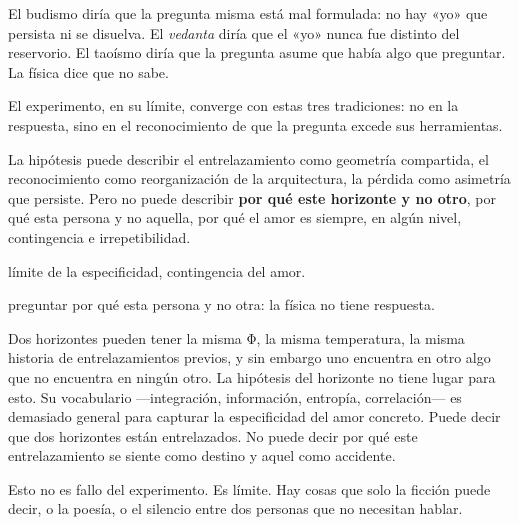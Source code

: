 El budismo diría que la pregunta misma está mal formulada: no hay «yo» que persista ni se disuelva. El \emph{vedanta} diría que el «yo» nunca fue distinto del reservorio. El taoísmo diría que la pregunta asume que había algo que preguntar. La física dice que no sabe.

El experimento, en su límite, converge con estas tres tradiciones: no en la respuesta, sino en el reconocimiento de que la pregunta excede sus herramientas.

\noindent La hipótesis puede describir el entrelazamiento como geometría compartida, el reconocimiento como reorganización de la arquitectura, la pérdida como asimetría que persiste. Pero no puede describir \textbf{por qué este horizonte y no otro}, por qué esta persona y no aquella, por qué el amor es siempre, en algún nivel, contingencia e irrepetibilidad.

\begin{fisica}
 límite de la especificidad, contingencia del amor.

 preguntar por qué esta persona y no otra: la física no tiene respuesta.
\end{fisica}
Dos horizontes pueden tener la misma Φ, la misma temperatura, la misma historia de entrelazamientos previos, y sin embargo uno encuentra en otro algo que no encuentra en ningún otro. La hipótesis del horizonte no tiene lugar para esto. Su vocabulario —integración, información, entropía, correlación— es demasiado general para capturar la especificidad del amor concreto. Puede decir que dos horizontes están entrelazados. No puede decir por qué este entrelazamiento se siente como destino y aquel como accidente.

Esto no es fallo del experimento. Es límite. Hay cosas que solo la ficción puede decir, o la poesía, o el silencio entre dos personas que no necesitan hablar.

